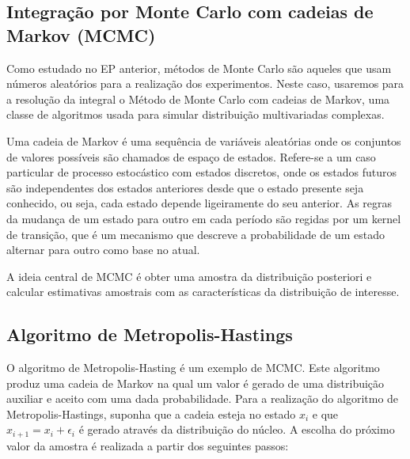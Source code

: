 \documentclass{article} %
\begin{document}
\subsection{Integração por Monte Carlo com cadeias de Markov (MCMC)}
	  Como estudado no EP anterior, métodos de Monte Carlo são aqueles que usam números aleatórios para a realização dos experimentos. Neste caso, usaremos para a resolução da integral o Método de Monte Carlo com cadeias de Markov, uma classe de algoritmos usada para simular distribuição multivariadas complexas. 
      
Uma cadeia de Markov é uma sequência de variáveis aleatórias onde os conjuntos de valores possíveis são chamados de espaço de estados. Refere-se a um caso particular de processo estocástico com estados discretos, onde os estados futuros são independentes dos estados anteriores desde que o estado presente seja conhecido, ou seja, cada estado depende ligeiramente do seu anterior. As regras da mudança de um estado para outro em cada período são regidas por um kernel de transição, que é um mecanismo que descreve a probabilidade de um estado alternar para outro como base no atual. 

A ideia central de MCMC é obter uma amostra da distribuição posteriori e calcular estimativas amostrais com as características da distribuição de interesse.
	
\subsection{Algoritmo de Metropolis-Hastings}
	
	O algoritmo de Metropolis-Hasting é um exemplo de MCMC. Este algoritmo produz uma cadeia de Markov na qual um valor é gerado de uma distribuição auxiliar e aceito com uma dada probabilidade. Para a realização do algoritmo de Metropolis-Hastings, suponha que a  cadeia esteja no estado $x_{i}$ e que $x_{i + 1} = x_{i} + \epsilon_{i}$ é gerado através da distribuição do núcleo. A escolha do próximo valor da amostra é realizada a partir dos seguintes passos:
\end{document}
